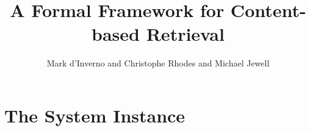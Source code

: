 \documentclass[11pt]{article}
\title{A Formal Framework for Content-based Retrieval}
\author{Mark d'Inverno and Christophe Rhodes and Michael Jewell}
\begin{document}
\maketitle



\section{The System Instance}

\newcommand{\LET}{\mathrel{\sf Let}}

\newcommand{\mylet}{\methrel{\sf Let}}
\newcommand{\FV}{\mathrel{~FV}}
\newcommand{\V}{\mathrel{~FV^{d}}}
\newcommand{\U}{\mathrel{~FV^{1}}}
\newcommand{\R}{\mathrel{~R}}

\newcommand{\mylog}{\mathrel{ln}}
\end{document}
